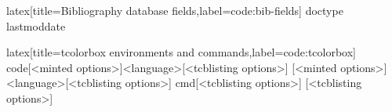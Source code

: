 \begin{code}[firstnumber=last]{latex}[title={Bibliography database fields},label=code:bib-fields]
doctype
lastmoddate
\end{code}
%
\begin{code}[firstnumber=last]{latex}[title={tcolorbox environments and commands},label=code:tcolorbox]
{code}[<minted options>]{<language>}[<tcblisting options>]
[<minted options>]{<language>}[<tcblisting options>]
{cmd}[<tcblisting options>]
[<tcblisting options>]
\end{code}

\begin{comment}

\clearpage
\subsection{subsection 1}

\section{Test appendix 2}

\section{Test appendix 3}
\clearpage
\subsection{subsection 1}
\clearpage
\subsection{subsection 2}
\clearpage

\end{comment}
